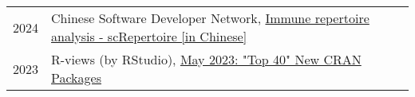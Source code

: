 \begin{longtable}[l]{@{}p{} p{}}

    2024 & Chinese Software Developer Network, \href{https://blog.csdn.net/weixin_64317226/article/details/139983483}{Immune repertoire analysis - scRepertoire [in Chinese]}~\cite{screp} \\
    
    2023 & R-views (by RStudio), \href{https://rviews.rstudio.com/2023/06/28/may-2023-top-40-new-cran-packages/}{May 2023: "Top 40" New CRAN Packages}~\cite{apotc} \\

\end{longtable}